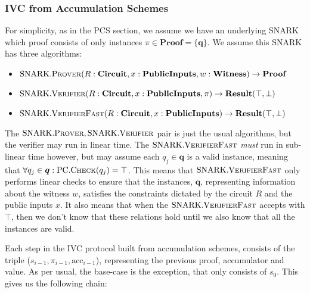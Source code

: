 \documentclass[
]{article}
\providecommand{\tightlist}{%
  \setlength{\itemsep}{0pt}\setlength{\parskip}{0pt}}
\let\origfigure\figure
\let\endorigfigure\endfigure
\renewenvironment{figure}[1][2] {
    \expandafter\origfigure\expandafter[H]
} {
    \endorigfigure
}
\newcommand*\Pc{\mathcal{P}}
\renewcommand{\vec}[1]{ \boldsymbol{#1} }
\newcommand*{\acc}{\mathrm{acc}}
\newcommand*{\Prover}{\mathrm{\text{P\scriptsize ROVER}}}
\newcommand*{\Verifier}{\mathrm{\text{V\scriptsize ERIFIER}}}
\newcommand*{\SNARKProver}{\mathrm{\text{SNARK}}.\Prover}
\newcommand*{\SNARKVerifier}{\mathrm{\text{SNARK}}.\Verifier}
\newcommand*{\SNARKVerifierFast}{\mathrm{\text{SNARK}}.\mathrm{\text{V\scriptsize ERIFIER}\text{F\scriptsize AST}}}
\newcommand*{\IVCProver}{\mathrm{\text{IVC}}.\Prover}
\newcommand*{\AS}{\text{AS}}
\newcommand*{\ASProver}{\AS.\Prover}
\newcommand*{\PC}{\text{PC}}
\newcommand*{\PCCheck}{\PC.\mathrm{\text{C\scriptsize HECK}}}
\newcommand*\Result{\mathbf{Result}}
\newcommand*\Proof{\mathbf{Proof}}
\newcommand*\Witness{\mathbf{Witness}}
\newcommand*\PublicInfo{\mathbf{PublicInputs}}
\newcommand*\Circuit{\mathbf{Circuit}}
\begin{document}
\subsubsection{IVC from Accumulation
Schemes}\label{ivc-from-accumulation-schemes}

For simplicity, as in the PCS section, we assume we have an underlying
SNARK which proof consists of only instances
\(\pi \in \Proof = \{ \vec{q} \}\). We assume this SNARK has three
algorithms:

\begin{itemize}
\tightlist
\item
  \(\SNARKProver(R: \Circuit, x: \PublicInfo, w: \Witness) \to \Proof\)
\item
  \(\SNARKVerifier(R: \Circuit, x: \PublicInfo, \pi) \to \Result(\top, \bot)\)
\item
  \(\SNARKVerifierFast(R: \Circuit, x: \PublicInfo) \to \Result(\top, \bot)\)
\end{itemize}

The \(\SNARKProver, \SNARKVerifier\) pair is just the usual algorithms,
but the verifier may run in linear time. The \(\SNARKVerifierFast\)
\emph{must} run in sub-linear time however, but may assume each
\(q_j \in \vec{q}\) is a valid instance, meaning that
\(\forall q_j \in \vec{q} : \PCCheck(q_j)
= \top\). This means that \(\SNARKVerifierFast\) only performs linear
checks to ensure that the instances, \(\vec{q}\), representing
information about the witness \(w\), satisfies the constraints dictated
by the circuit \(R\) and the public inputs \(x\). It also means that
when the \(\SNARKVerifierFast\) accepts with \(\top\), then we don't
know that these relations hold until we also know that all the instances
are valid.

Each step in the IVC protocol built from accumulation schemes, consists
of the triple (\(s_{i-1}, \pi_{i-1}, \acc_{i-1}\)), representing the
previous proof, accumulator and value. As per usual, the base-case is
the exception, that only consists of \(s_0\). This gives us the
following chain:

\begin{figure}[!H]
\centering
{}
\caption{
  A visualization of the relationship between $F, \vec{s}, \vec{\pi}$ and
  $\vec{\acc}$ in an IVC setting using Accumulation Schemes. Where $\Pc$ is
  defined to be $\Pc(s_{i-1}, \pi_{i-1}, \acc_{i-1}) = \IVCProver(s_{i-1},
  \pi_{i-1}, \acc_{i-1}) = \pi_i$, $s_i = F(s_{i-1})$, $\acc_i =
  \ASProver(\vec{q}, \acc_{i-1})$.
}
\end{figure}
\end{document}
